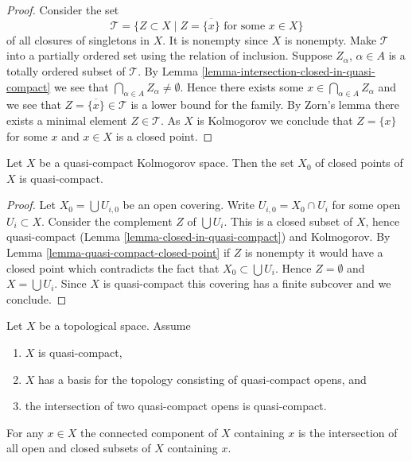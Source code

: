 \begin{proof}
Consider the set
$$
\mathcal{T} =
\{Z \subset X \mid Z = \overline{\{x\}} \text{ for some }x \in X\}
$$
of all closures of singletons in $X$. It is nonempty since $X$ is
nonempty. Make $\mathcal{T}$ into a
partially ordered set using the relation of inclusion.
Suppose $Z_\alpha$, $\alpha \in A$ is a totally ordered subset of $\mathcal{T}$.
By Lemma \ref{lemma-intersection-closed-in-quasi-compact} we see
that $\bigcap_{\alpha \in A} Z_\alpha \not = \emptyset$. Hence there exists
some $x \in \bigcap_{\alpha \in A} Z_\alpha$ and we see that
$Z = \overline{\{x\}}\in \mathcal{T}$ is a lower bound for
the family. By Zorn's lemma there exists a minimal element
$Z \in \mathcal{T}$. As $X$ is Kolmogorov we conclude that
$Z = \{x\}$ for some $x$ and $x \in X$ is a closed point.
\end{proof}

\begin{lemma}
\label{lemma-closed-points-quasi-compact}
Let $X$ be a quasi-compact Kolmogorov space. Then the set $X_0$ of
closed points of $X$ is quasi-compact.
\end{lemma}

\begin{proof}
Let $X_0 = \bigcup U_{i, 0}$ be an open covering.
Write $U_{i, 0} = X_0 \cap U_i$ for some open $U_i \subset X$.
Consider the complement $Z$ of $\bigcup U_i$. This is a closed subset of
$X$, hence quasi-compact (Lemma \ref{lemma-closed-in-quasi-compact})
and Kolmogorov. By Lemma \ref{lemma-quasi-compact-closed-point}
if $Z$ is nonempty it would have a closed
point which contradicts the fact that $X_0 \subset \bigcup U_i$.
Hence $Z = \emptyset$ and $X = \bigcup U_i$. Since $X$ is quasi-compact
this covering has a finite subcover and we conclude.
\end{proof}

\begin{lemma}
\label{lemma-connected-component-intersection}
Let $X$ be a topological space.
Assume
\begin{enumerate}
\item $X$ is quasi-compact,
\item $X$ has a basis for the topology consisting of quasi-compact opens, and
\item the intersection of two quasi-compact opens is quasi-compact.
\end{enumerate}
For any $x \in X$ the connected component of $X$ containing
$x$ is the intersection of all open and closed subsets
of $X$ containing $x$.
\end{lemma}

